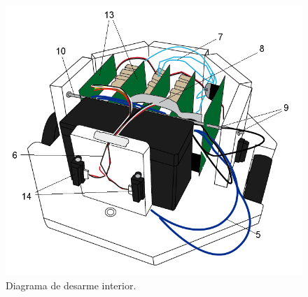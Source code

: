 \begin{figure}
	\centering
	\includegraphics[scale=.45]{figuras/desarme_2.png}
	\caption{Diagrama de desarme interior.}
	\label{hF_desarme_2}
\end{figure}

